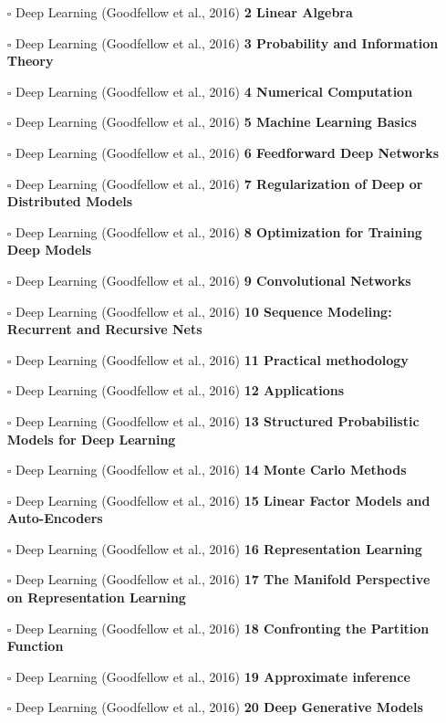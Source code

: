 \documentclass[a4, landscape, 12pt]{article}
\newcommand{\checkbox}{$\square$}%
\begin{document}
\begin{itemize}
{}
\item [\checkbox]  Deep Learning (Goodfellow et al., 2016) \textbf{ 2 Linear Algebra
}
\item [\checkbox]  Deep Learning (Goodfellow et al., 2016) \textbf{ 3 Probability and Information Theory
}
\item [\checkbox]  Deep Learning (Goodfellow et al., 2016) \textbf{ 4 Numerical Computation
}
\item [\checkbox]  Deep Learning (Goodfellow et al., 2016) \textbf{ 5 Machine Learning Basics
}
\item [\checkbox]  Deep Learning (Goodfellow et al., 2016) \textbf{ 6 Feedforward Deep Networks
}
\item [\checkbox]  Deep Learning (Goodfellow et al., 2016) \textbf{ 7 Regularization of Deep or Distributed Models
}
\item [\checkbox]  Deep Learning (Goodfellow et al., 2016) \textbf{ 8 Optimization for Training Deep Models
}
\item [\checkbox]  Deep Learning (Goodfellow et al., 2016) \textbf{ 9 Convolutional Networks
}
\item [\checkbox]  Deep Learning (Goodfellow et al., 2016) \textbf{ 10 Sequence Modeling: Recurrent and Recursive Nets
}
\item [\checkbox]  Deep Learning (Goodfellow et al., 2016) \textbf{ 11 Practical methodology
}
\item [\checkbox]  Deep Learning (Goodfellow et al., 2016) \textbf{ 12 Applications
}
\item [\checkbox]  Deep Learning (Goodfellow et al., 2016) \textbf{ 13 Structured Probabilistic Models for Deep Learning
}
\item [\checkbox]  Deep Learning (Goodfellow et al., 2016) \textbf{ 14 Monte Carlo Methods
}
\item [\checkbox]  Deep Learning (Goodfellow et al., 2016) \textbf{ 15 Linear Factor Models and Auto-Encoders
}
\item [\checkbox]  Deep Learning (Goodfellow et al., 2016) \textbf{ 16 Representation Learning
}
\item [\checkbox]  Deep Learning (Goodfellow et al., 2016) \textbf{ 17 The Manifold Perspective on Representation Learning
}
\item [\checkbox]  Deep Learning (Goodfellow et al., 2016) \textbf{ 18 Confronting the Partition Function
}
\item [\checkbox]  Deep Learning (Goodfellow et al., 2016) \textbf{ 19 Approximate inference
}
\item [\checkbox]  Deep Learning (Goodfellow et al., 2016) \textbf{ 20 Deep Generative Models
}
\end{itemize}
\end{document}
